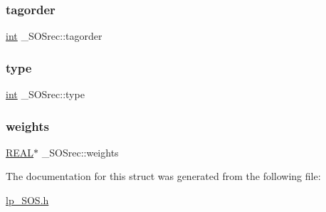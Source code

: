 \subsubsection{\texorpdfstring{tagorder}{tagorder}}
{\footnotesize\ttfamily \hyperlink{lp__lib_8h_adeb9ec6400320e4923ac9d836d509ddb}{int} \+\_\+\+S\+O\+Srec\+::tagorder}

\mbox{\label{struct___s_o_srec_a43c05db591c2d375a8697bcaffb8f6c7}} 
\subsubsection{\texorpdfstring{type}{type}}
{\footnotesize\ttfamily \hyperlink{lp__lib_8h_adeb9ec6400320e4923ac9d836d509ddb}{int} \+\_\+\+S\+O\+Srec\+::type}

\mbox{\label{struct___s_o_srec_a57901e1d53a519dee2410c74346c3645}} 
\subsubsection{\texorpdfstring{weights}{weights}}
{\footnotesize\ttfamily \hyperlink{lp__lib_8h_a92bd5e363d131fa73669358edb232dce}{R\+E\+AL}$\ast$ \+\_\+\+S\+O\+Srec\+::weights}



The documentation for this struct was generated from the following file\+:\begin{DoxyCompactItemize}
\item 
\hyperlink{lp___s_o_s_8h}{lp\+\_\+\+S\+O\+S.\+h}\end{DoxyCompactItemize}

